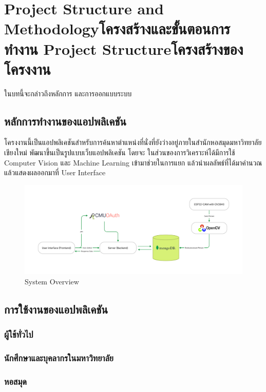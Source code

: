 \chapter{\ifproject%
\ifenglish Project Structure and Methodology\else โครงสร้างและขั้นตอนการทำงาน\fi
\else%
\ifenglish Project Structure\else โครงสร้างของโครงงาน\fi
\fi
}

ในบทนี้จะกล่าวถึงหลักการ และการออกแบบระบบ

\section{หลักการทำงานของแอปพลิเคชัน}
โครงงานนี้เป็นแอปพลิเคชันสำหรับการค้นหาตำแหน่งที่นั่งที่ยังว่างอยู่ภายในสำนักหอสมุดมหาวิทยาลัยเชียงใหม่ พัฒนาขึ้นเป็นรูปแบบเว็บแอปพลิเคชัน\cite{aiw}
โดยจะ ในส่วนของการวิเคราะห์ได้มีการใช้ Computer Vision และ Machine Learning เข้ามาช่วยในการแยก แล้วนำผลลัพธ์ที่ได้มาคำนวณ แล้วแสดงผลออกมาที่ User Interface
\begin{figure}[h]
\centering
\includegraphics[width=\textwidth]{System Diagram.jpg}
\caption[System Overview]{System Overview}
\label{fig:System}
\end{figure}

\section{การใช้งานของแอปพลิเคชัน}
\subsection{ผู้ใช้ทั่วไป}
\subsection{นักศึกษาและบุคลากรในมหาวิทยาลัย}
\subsection{หอสมุด}